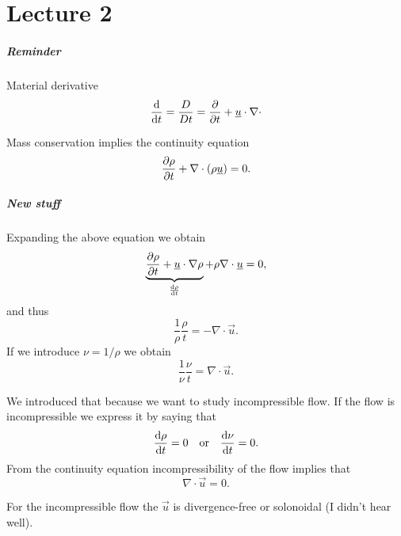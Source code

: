 \documentclass[../main.tex]{subfiles}
\begin{document}
  \chapter{Lecture 2}
    \paragraph{Reminder}
    Material derivative 
    \begin{displaymath}
      \frac{\mathrm{d} }{\mathrm{d} t} = \frac{D}{Dt} = \frac{\partial }{\partial t} + \underline{u} \cdot \nabla \cdot
    \end{displaymath}

    Mass conservation implies the continuity equation
    \begin{displaymath}
      \frac{\partial \rho}{\partial t} + \nabla \cdot ( \rho \underline{u} ) = 0.
    \end{displaymath}

    \paragraph{New stuff}
    Expanding the above equation we obtain
    \begin{displaymath}
      \underbrace{\frac{\partial \rho}{\partial t} + \underline{u} \cdot \nabla \rho}_{\frac{\mathrm{d} \rho}{\mathrm{d} t}} + \rho \nabla \cdot \underline{u} = 0,
    \end{displaymath}
    and thus
    \begin{displaymath}
      \frac{1}{\rho} \dfrac{\rho}{t} = - \nabla \cdot \vec u. 
    \end{displaymath}
    If we introduce  $\nu = 1 / \rho$ we obtain
    \begin{displaymath}
      \frac{1}{\nu} \dfrac{\nu}{t} = \nabla \cdot \vec u.
    \end{displaymath}

    We introduced that because we want to study incompressible flow.
    If the flow is incompressible we express it by saying that
    \begin{displaymath}
      \frac{\mathrm{d} \rho}{\mathrm{d} t} = 0 \quad \textrm{or}\quad  \frac{\mathrm{d} \nu}{\mathrm{d} t} = 0.
    \end{displaymath}
    From the continuity equation incompressibility of the flow implies that
    \begin{displaymath}
      \nabla \cdot \vec u = 0.
    \end{displaymath}
    
    For the incompressible flow the $\vec u$ is divergence-free or solonoidal (\todo I didn't hear well).
\end{document}
